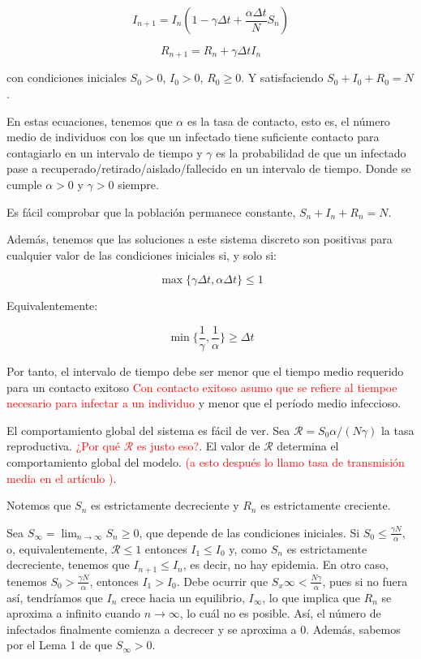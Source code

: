 \begin{equation}
\label{eqn: SIR_modelo_I}
I_{n+1} = I_n \left( 1-\gamma \Delta t + \frac{\alpha\Delta t}{N} S_n \right)
\end{equation}

\begin{equation}
\label{eqn: SIR_modelo_R}
R_{n+1} = R_n + \gamma \Delta t I_n
\end{equation}

con condiciones iniciales $S_0>0$, $I_0>0$, $R_0\geq 0$. Y satisfaciendo $S_0+I_0+R_0=N$.

En estas ecuaciones, tenemos que $\alpha$ es la tasa de contacto, esto es, el número medio de individuos con los que un infectado tiene suficiente contacto para contagiarlo en un intervalo de tiempo y $\gamma$ es la probabilidad de que un infectado pase a recuperado/retirado/aislado/fallecido en un intervalo de tiempo. Donde se cumple $\alpha >0$ y $\gamma >0$ siempre.

Es fácil comprobar que la población permanece constante, $S_n+I_n+R_n=N$.

Además, tenemos que las soluciones a este sistema discreto son positivas para cualquier valor de las condiciones iniciales si, y solo si:

$$\max{\big\{\gamma\Delta t, \alpha\Delta t\big\} } \leq 1$$

Equivalentemente:

$$\min{\bigg\{ \frac{1}{\gamma}, \frac{1}{\alpha} \bigg\} } \geq \Delta t$$

Por tanto, el intervalo de tiempo debe ser menor que el tiempo medio requerido para un contacto exitoso \textcolor{red}{Con contacto exitoso asumo que se refiere al tiempoe necesario para infectar a un individuo} y menor que el período medio infeccioso.

El comportamiento global del sistema es fácil de ver. Sea $\mathcal{R}=S_0 \alpha/(N\gamma )$ la tasa reproductiva. \textcolor{red}{¿Por qué $\mathcal{R}$ es justo eso?}. El valor de $\mathcal{R}$ determina el comportamiento global del modelo. \textcolor{red}{(a esto después lo llamo tasa de transmisión media en el artículo \cite{demongeotSIEpidemicModel})}. 

Notemos que $S_n$ es estrictamente decreciente y $R_n$ es estrictamente creciente.

Sea $S_\infty=\lim_{n\rightarrow\infty} S_n\geq 0$, que depende de las condiciones iniciales. Si $S_0\leq \frac{\gamma N}{\alpha}$, o, equivalentemente, $\mathcal{R}\leq 1$ entonces $I_1\leq I_0$ y, como $S_n$ es estrictamente decreciente, tenemos que $I_{n+1}\leq I_n$, es decir, no hay epidemia. En otro caso, tenemos $S_0> \frac{\gamma N}{\alpha}$, entonces $I_1>I_0$. Debe ocurrir que $S_x\infty <\frac{N\gamma}{\alpha}$, pues si no fuera así, tendríamos que $I_n$ crece hacia un equilibrio, $I_\infty$, lo que implica que $R_n$ se aproxima a infinito cuando $n\rightarrow\infty$, lo cuál no es posible. Así, el número de infectados finalmente comienza a decrecer y se aproxima a $0$. Además, sabemos por el Lema 1 de \cite{allenDiscretetimeSISIR1994} que $S_\infty>0$.

